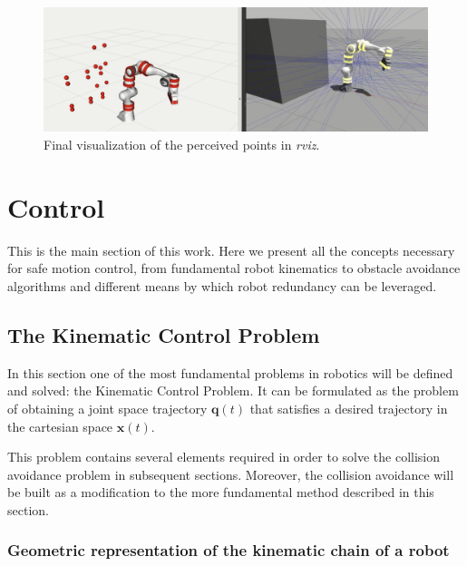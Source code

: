 \begin{figure}[H]
    \caption[Spheres]{
    Final visualization of the perceived points in \textit{rviz}.
    }
    \begin{center}
    \includegraphics[width=\textwidth]{figs/visualizationpoints.png}
    \end{center}
\label{fig:visualizationpoints}
\end{figure}







\section{Control}
\label{s:control}

This is the main section of this work. Here we present all the concepts necessary for safe motion control, from fundamental robot kinematics to obstacle avoidance algorithms and different means by which robot redundancy can be leveraged.

\subsection{The Kinematic Control Problem}
\label{ss:kinematiccontrol}
In this section one of the most fundamental problems in robotics will be defined and solved: the Kinematic Control Problem. It can be formulated as the problem of obtaining a joint space trajectory $\mathbf{q}(t)$ that satisfies a desired trajectory in the cartesian space $\mathbf{x}(t)$.

This problem contains several elements required in order to solve the collision avoidance problem in subsequent sections. Moreover, the collision avoidance will be built as a modification to the more fundamental method described in this section.

\subsubsection{Geometric representation of the kinematic chain of a robot}
\label{sss:geomrep}

